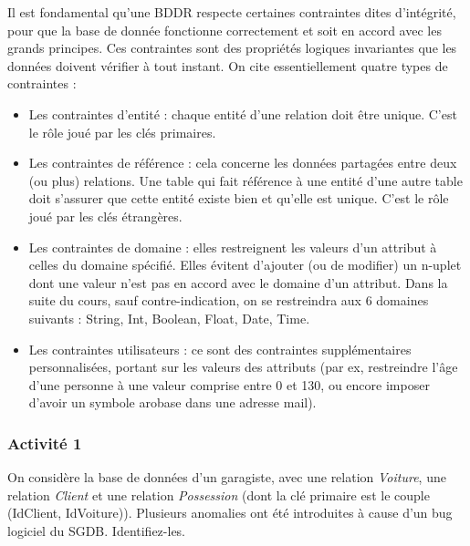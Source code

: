 \documentclass[french,11pt,twoside]{VcCours}
\begin{document}
Il est fondamental qu'une BDDR respecte certaines contraintes dites d'intégrité, pour que la base de donnée fonctionne correctement et soit en accord avec les grands principes. Ces contraintes sont des propriétés logiques invariantes que les données doivent vérifier à tout instant. On cite essentiellement quatre types de contraintes :
\begin{itemize}
 \item Les contraintes d'entité : chaque entité d'une relation doit être unique. C'est le rôle joué par les clés primaires.
 \item Les contraintes de référence : cela concerne les données partagées entre deux (ou plus) relations. Une table qui fait référence à une entité d'une autre table doit s'assurer que cette entité existe bien et qu'elle est unique. C'est le rôle joué par les clés étrangères.
 \item Les contraintes de domaine : elles restreignent les valeurs d'un attribut à celles du domaine spécifié. Elles évitent d'ajouter (ou de modifier) un n-uplet dont une valeur n'est pas en accord avec le domaine d'un attribut. Dans la suite du cours, sauf contre-indication, on se restreindra aux 6 domaines suivants : String, Int, Boolean, Float, Date, Time.
 \item Les contraintes utilisateurs : ce sont des contraintes supplémentaires personnalisées, portant sur les valeurs des attributs (par ex, restreindre l'âge d'une personne à une valeur comprise entre 0 et 130, ou encore imposer d'avoir un symbole arobase dans une adresse mail).
\end{itemize}


\subsubsection*{Activité 1}

On considère la base de données d'un garagiste, avec une relation \emph{Voiture}, une relation \emph{Client} et une relation \emph{Possession} (dont la clé primaire est le couple (IdClient, IdVoiture)). Plusieurs anomalies ont été introduites à cause d'un bug logiciel du SGDB. Identifiez-les.
\end{document}
